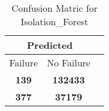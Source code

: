 \begin{table}[] 
\caption{Confusion Matric for Isolation_Forest} 
\label{Table: Prediction Accuracy-DMDIsolation_ForestOnlySunEKF-ignoreReflection100.9EKF-top2-Reflection} 
\centering 
\begin{tabular} 
 {@{}ccc@{}} 
\toprule 
\multicolumn{2}{c}{\textbf{Predicted}}
 \\ \midrule 
\multicolumn{1}{|c|}{Failure} & 
\multicolumn{1}{c|}{No Failure}
 \\ \midrule 
\multicolumn{1}{|c|}{\color{red}\textbf{139}} & 
\multicolumn{1}{c|}{\color{green}\textbf{132433}}
 \\ \midrule 
\multicolumn{1}{|c|}{\color{green}\textbf{377}} & 
\multicolumn{1}{c|}{\color{red}\textbf{37179}}
 \\ \bottomrule 
\end{tabular} 
\end{table} 
